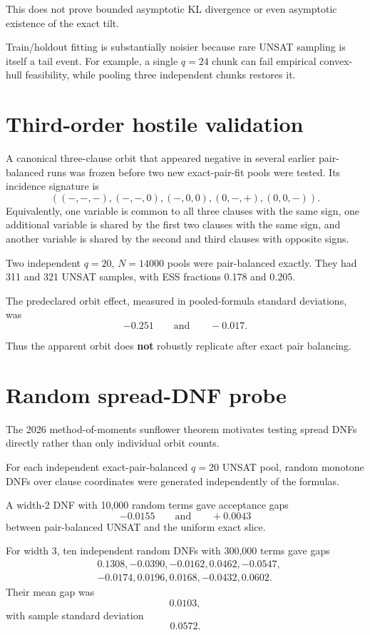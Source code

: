 \documentclass[11pt]{article}
\begin{document}
This does not prove bounded asymptotic KL divergence or even asymptotic
existence of the exact tilt.

Train/holdout fitting is substantially noisier because rare UNSAT sampling is
itself a tail event.  For example, a single \(q=24\) chunk can fail empirical
convex-hull feasibility, while pooling three independent chunks restores it.

\section{Third-order hostile validation}

A canonical three-clause orbit that appeared negative in several earlier
pair-balanced runs was frozen before two new exact-pair-fit pools were tested.
Its incidence signature is
\[
((-,-,-),(-,-,0),(-,0,0),(0,-,+),(0,0,-)).
\tag{7}
\]
Equivalently, one variable is common to all three clauses with the same sign,
one additional variable is shared by the first two clauses with the same
sign, and another variable is shared by the second and third clauses with
opposite signs.

Two independent \(q=20\), \(N=14000\) pools were pair-balanced exactly.
They had 311 and 321 UNSAT samples, with ESS fractions 0.178 and 0.205.

The predeclared orbit effect, measured in pooled-formula standard deviations,
was
\[
-0.251
\qquad\text{and}\qquad
-0.017.
\]

Thus the apparent orbit does \textbf{not} robustly replicate after exact
pair balancing.

\section{Random spread-DNF probe}

The 2026 method-of-moments sunflower theorem motivates testing spread DNFs
directly rather than only individual orbit counts.

For each independent exact-pair-balanced \(q=20\) UNSAT pool, random monotone
DNFs over clause coordinates were generated independently of the formulas.

A width-2 DNF with 10,000 random terms gave acceptance gaps
\[
-0.0155
\qquad\text{and}\qquad
+0.0043
\]
between pair-balanced UNSAT and the uniform exact slice.

For width 3, ten independent random DNFs with 300,000 terms gave gaps
\[
\begin{split}
&0.1308,-0.0390,-0.0162,0.0462,-0.0547,\\
&-0.0174,0.0196,0.0168,-0.0432,0.0602.
\end{split}
\tag{8}
\]
Their mean gap was
\[
0.0103,
\]
with sample standard deviation
\[
0.0572.
\]
\end{document}
